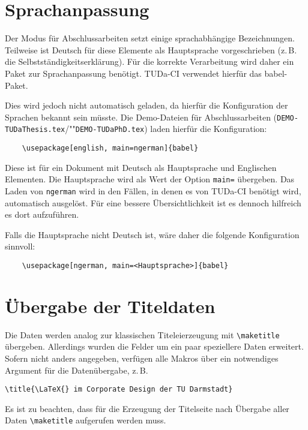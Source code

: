 \documentclass[
	ngerman,
	ruledheaders=section,%
	class=report,%
	thesis={type=bachelor},%
	accentcolor=9c,%
	custommargins=true,%
	marginpar=false,%
	parskip=half-,%
	fontsize=11pt,%
]{tudapub}
\let\file\texttt
\begin{document}
\section{Sprachanpassung}
Der Modus für Abschlussarbeiten setzt einige sprachabhängige Bezeichnungen.
Teilweise ist Deutsch für diese Elemente als Hauptsprache vorgeschrieben (z.\,B. die Selbstständigkeitserklärung). Für die korrekte Verarbeitung wird daher ein Paket zur Sprachanpassung benötigt.
TUDa-CI verwendet hierfür das babel-Paket.

Dies wird jedoch nicht automatisch geladen, da hierfür die Konfiguration der Sprachen bekannt sein müsste. Die Demo-Dateien für Abschlussarbeiten (\file{DEMO-TUDaThesis.tex}/""\file{DEMO-TUDaPhD.tex}) laden hierfür die Konfiguration:
\begin{verbatim}
	\usepackage[english, main=ngerman]{babel}
\end{verbatim}
Diese ist für ein Dokument mit Deutsch als Hauptsprache und Englischen Elementen.
Die Hauptsprache wird als Wert der Option \verb+main=+ übergeben.
Das Laden von \verb+ngerman+ wird in den Fällen, in denen es von TUDa-CI benötigt wird, automatisch ausgelöst.
Für eine bessere Übersichtlichkeit ist es dennoch hilfreich es dort aufzuführen.

Falls die Hauptsprache nicht Deutsch ist, wäre daher die folgende Konfiguration sinnvoll:
\begin{verbatim}
	\usepackage[ngerman, main=<Hauptsprache>]{babel}
\end{verbatim}

\section{Übergabe der Titeldaten}

Die Daten werden analog zur klassischen Titeleierzeugung mit \verb+\maketitle+ übergeben. Allerdings wurden die Felder um ein paar speziellere Daten erweitert. Sofern nicht anders angegeben, verfügen alle Makros über ein notwendiges Argument für die Datenübergabe, z.\,B.
\begin{verbatim}
\title{\LaTeX{} im Corporate Design der TU Darmstadt}
\end{verbatim}
Es ist zu beachten, dass für die Erzeugung der Titelseite nach Übergabe aller Daten \verb+\maketitle+ aufgerufen werden muss.
\end{document}
